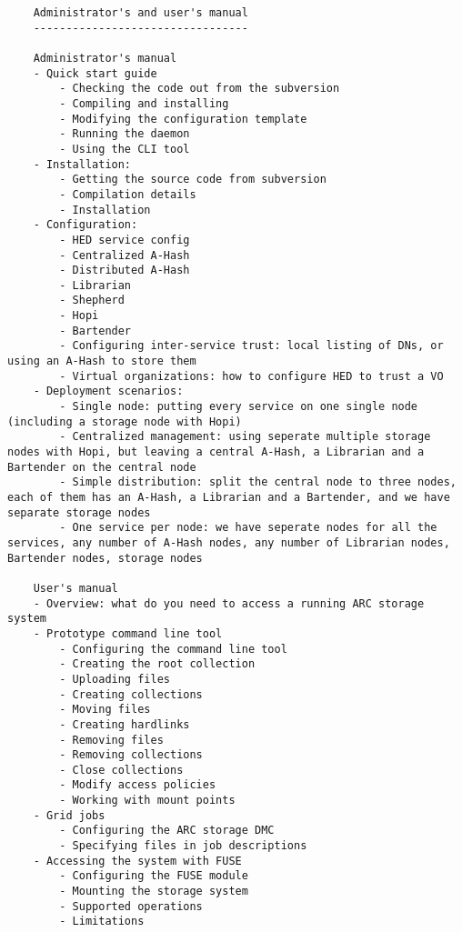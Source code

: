 \documentclass{book}
\renewcommand{\thefootnote}{\fnsymbol{footnote}}
\begin{document}
\tableofcontents                          %
\begin{verbatim}
    Administrator's and user's manual
    ---------------------------------

    Administrator's manual
    - Quick start guide
        - Checking the code out from the subversion
        - Compiling and installing
        - Modifying the configuration template
        - Running the daemon
        - Using the CLI tool
    - Installation:
        - Getting the source code from subversion
        - Compilation details
        - Installation
    - Configuration:
        - HED service config
        - Centralized A-Hash
        - Distributed A-Hash
        - Librarian
        - Shepherd
        - Hopi
        - Bartender
        - Configuring inter-service trust: local listing of DNs, or using an A-Hash to store them
        - Virtual organizations: how to configure HED to trust a VO
    - Deployment scenarios:
        - Single node: putting every service on one single node (including a storage node with Hopi)
        - Centralized management: using seperate multiple storage nodes with Hopi, but leaving a central A-Hash, a Librarian and a Bartender on the central node
        - Simple distribution: split the central node to three nodes, each of them has an A-Hash, a Librarian and a Bartender, and we have separate storage nodes
        - One service per node: we have seperate nodes for all the services, any number of A-Hash nodes, any number of Librarian nodes, Bartender nodes, storage nodes

    User's manual
    - Overview: what do you need to access a running ARC storage system
    - Prototype command line tool
        - Configuring the command line tool
        - Creating the root collection
        - Uploading files
        - Creating collections
        - Moving files
        - Creating hardlinks
        - Removing files
        - Removing collections
        - Close collections
        - Modify access policies
        - Working with mount points
    - Grid jobs
        - Configuring the ARC storage DMC
        - Specifying files in job descriptions
    - Accessing the system with FUSE
        - Configuring the FUSE module
        - Mounting the storage system
        - Supported operations
        - Limitations
    
\end{verbatim}

\newpage

\renewcommand{\thefootnote}{\arabic{footnote}}
\end{document}
